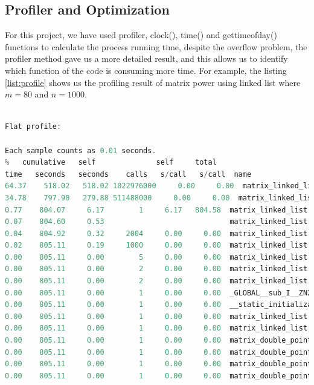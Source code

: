\documentclass[12pt]{article}
\begin{document}
\subsection{Profiler and Optimization}\label{subsec:opt}
For this project, we have used profiler, clock(), time() and gettimeofday()  functions to calculate the process running time, despite the overflow problem, the profiler method gave us a more detailed result, and this allows us to identify which function of the code is consuming more time. For example, the listing \ref{list:profile} shows us the profiling result of matrix power using linked list where $m=80$ and $n=1000$.  

\begin{lstlisting}[language=c++, caption={matrix\_double\_pointer class}, label={list:profile}, basicstyle=\tiny]

Flat profile:

Each sample counts as 0.01 seconds.
%   cumulative   self              self     total           
time   seconds   seconds    calls   s/call   s/call  name    
64.37    518.02   518.02 1022976000     0.00     0.00  matrix_linked_list::get_value(int, int)
34.78    797.90   279.88 511488000     0.00     0.00  matrix_linked_list::add_value(long double, int, int)
0.77    804.07     6.17        1     6.17   804.58  matrix_linked_list::operator^(int)
0.07    804.60     0.53                             matrix_linked_list::print_values_ij()
0.04    804.92     0.32     2004     0.00     0.00  matrix_linked_list::delete_all_node()
0.02    805.11     0.19     1000     0.00     0.00  matrix_linked_list::operator=(matrix_linked_list const&)
0.00    805.11     0.00        5     0.00     0.00  matrix_linked_list::~matrix_linked_list()
0.00    805.11     0.00        2     0.00     0.00  matrix_linked_list::matrix_linked_list(matrix_linked_list const&)
0.00    805.11     0.00        2     0.00     0.00  matrix_linked_list::matrix_linked_list()
0.00    805.11     0.00        1     0.00     0.00  _GLOBAL__sub_I__ZN21matrix_double_pointerC2Ei
0.00    805.11     0.00        1     0.00     0.00  __static_initialization_and_destruction_0(int, int)
0.00    805.11     0.00        1     0.00     0.00  matrix_linked_list::load(long double**, int)
0.00    805.11     0.00        1     0.00     0.00  matrix_linked_list::matrix_linked_list(int)
0.00    805.11     0.00        1     0.00     0.00  matrix_double_pointer::get_matrix()
0.00    805.11     0.00        1     0.00     0.00  matrix_double_pointer::init_rand()
0.00    805.11     0.00        1     0.00     0.00  matrix_double_pointer::matrix_double_pointer(int)
0.00    805.11     0.00        1     0.00     0.00  matrix_double_pointer::~matrix_double_pointer()

\end{lstlisting}
\end{document}
